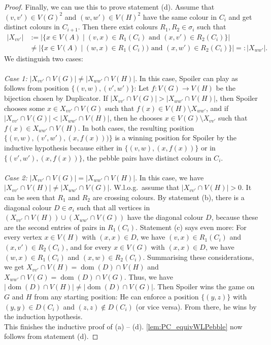 \documentclass[a4paper,UKenglish,cleveref, autoref, thm-restate]{lipics-v2021}
\newcommand{\lra}{\longrightarrow}
\newcommand{\dom}{\operatorname{dom}}
\begin{document}
\begin{proof}
			Finally, we can use this to prove statement (d). Assume that $(v,v') \in V(G)^2$ and $(w,w') \in V(H)^2$ have the same colour in $C_i$ and get distinct colours in $C_{i+1}$. Then there exist colours $R_1, R_2 \in \sigma_i$ such that 
			\begin{align*}
				| X_{vv'} | &:= |\{  x \in V(A) \mid (v,x) \in R_1(C_i) \text{ and } (x,v') \in R_2(C_i)   \}| \\
				&\neq |\{ x \in V(A) \mid (w,x) \in R_1(C_i)) \text{ and } (x,w') \in R_2(C_i)  \}| =: | X_{ww'} |.
			\end{align*}
			We distinguish two cases:\\
			\\
			\textit{Case 1:} $|X_{vv'} \cap V(G)| \neq |X_{ww'} \cap V(H)|$. In this case, Spoiler can play as follows from position $\{(v,w),(v',w')\}$: Let $f : V(G) \lra V(H)$ be the bijection chosen by Duplicator. If $|X_{vv'} \cap V(G)| > |X_{ww'} \cap V(H)|$, then Spoiler chooses some $x \in X_{vv'} \cap V(G)$ such that $f(x) \in V(H) \setminus X_{ww'}$, and if $|X_{vv'} \cap V(G)| < |X_{ww'} \cap V(H)|$, then he chooses $x \in V(G) \setminus X_{vv'}$ such that $f(x) \in X_{ww'} \cap V(H)$. In both cases, the resulting position $\{(v,w),(v',w'), (x,f(x)))\}$ is a winning position for Spoiler by the inductive hypothesis because either in $\{ (v,w), (x,f(x))  \}$ or in $\{ (v',w'), (x,f(x)) \}$, the pebble pairs have distinct colours in $C_i$.\\
			\\
			\textit{Case 2:} $|X_{vv'} \cap V(G)| = |X_{ww'} \cap V(H)|$. In this case, we have $|X_{vv'} \cap V(H)| \neq | X_{ww'} \cap V(G) |$. W.l.o.g.\ assume that $|X_{vv'} \cap V(H)| > 0$. It can be seen that $R_1$ and $R_2$ are crossing colours. By statement (b), there is a diagonal colour $D \in \sigma_i$ such that all vertices in $(X_{vv'} \cap V(H)) \cup (X_{ww'} \cap V(G))$ have the diagonal colour $D$, because these are the second entries of pairs in $R_1(C_i)$. Statement (c) says even more: For every vertex $x \in V(H)$ with $(x,x) \in D$, we have $(v,x) \in R_1(C_i)$ and $(x,v') \in R_2(C_i)$, and for every $x \in V(G)$ with $(x,x) \in D$, we have $(w,x) \in R_1(C_i)$ and $(x,w) \in R_2(C_i)$. Summarising these considerations, we get $X_{vv'} \cap V(H) = \dom (D) \cap V(H)$ and $X_{ww'} \cap V(G) = \dom(D) \cap V(G)$. Thus, we have  
			$|\dom (D) \cap V(H)| \neq | \dom(D) \cap V(G) |$. Then Spoiler wins the game on $G$ and $H$ from any starting position: He can enforce a position $\{  (y,z)   \}$ with $(y,y) \in D(C_i)$ and $(z,z) \notin D(C_i)$ (or vice versa). From there, he wins by the induction hypothesis.\\
			This finishes the inductive proof of (a) -- (d).
			\autoref{lem:PC_equivWLPebble} now follows from statement (d).
		\end{proof}
		

	
	
	
\end{document}
